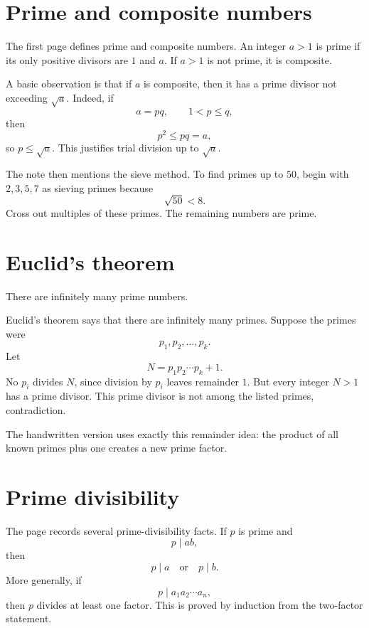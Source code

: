 
\section{Prime and composite numbers}

The first page defines prime and composite numbers.  An integer $a>1$ is prime if its only positive divisors are $1$ and $a$.  If $a>1$ is not prime, it is composite.

A basic observation is that if $a$ is composite, then it has a prime divisor not exceeding $\sqrt a$.  Indeed, if
\[
  a=pq,\qquad 1<p\le q,
\]
then
\[
  p^2\le pq=a,
\]
so $p\le\sqrt a$.  This justifies trial division up to $\sqrt a$.

The note then mentions the sieve method.  To find primes up to $50$, begin with $2,3,5,7$ as sieving primes because
\[
  \sqrt{50}<8.
\]
Cross out multiples of these primes.  The remaining numbers are prime.

\section{Euclid's theorem}

\begin{theorem}
There are infinitely many prime numbers.
\end{theorem}


Euclid's theorem says that there are infinitely many primes.  Suppose the primes were
\[
  p_1,p_2,\ldots,p_k.
\]
Let
\[
  N=p_1p_2\cdots p_k+1.
\]
No $p_i$ divides $N$, since division by $p_i$ leaves remainder $1$.  But every integer $N>1$ has a prime divisor.  This prime divisor is not among the listed primes, contradiction.

The handwritten version uses exactly this remainder idea: the product of all known primes plus one creates a new prime factor.

\section{Prime divisibility}

The page records several prime-divisibility facts.  If $p$ is prime and
\[
  p\mid ab,
\]
then
\[
  p\mid a\quad\text{or}\quad p\mid b.
\]
More generally, if
\[
  p\mid a_1a_2\cdots a_n,
\]
then $p$ divides at least one factor.  This is proved by induction from the two-factor statement.

